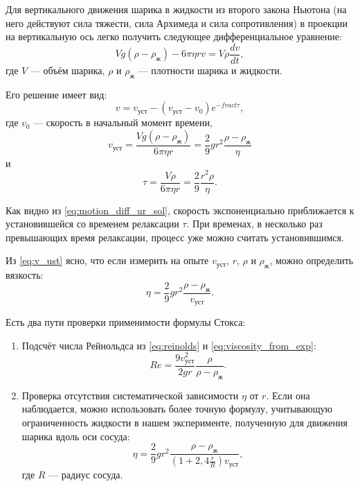 \documentclass[12pt]{article}
\begin{document}
	Для вертикального движения шарика в жидкости из второго закона Ньютона (на него действуют сила тяжести, сила Архимеда и сила сопротивления) в проекции на вертикальную ось легко получить следующее дифференциальное уравнение:
	\begin{equation}
	\label{eq:motion_diff_ur}
	Vg \left( \rho -\rho_\text{ж} \right) -6\pi \eta rv=V\rho \frac{dv}{dt},
	\end{equation}
	где $V$ --- объём шарика, $\rho$ и $\rho_\text{ж}$ --- плотности шарика и жидкости.
	
	Его решение имеет вид:
	\begin{equation}
	\label{eq:motion_diff_ur_sol}
	v=v_\text{уст}-\left( v_\text{уст}-v_0 \right) e^{-frac{t}{\tau}},
	\end{equation}
	где $v_0$ --- скорость в начальный момент времени,
	\begin{equation}
	\label{eq:v_ust}
	v_\text{уст}=\frac{Vg \left( \rho -\rho_\text{ж} \right)}{6\pi \eta r} = \frac{2}{9} gr^2 \frac{\rho -\rho_\text{ж}}{\eta}
	\end{equation}
	и
	\begin{equation}
	\label{eq:tau}
	\tau=\frac{V \rho}{6\pi \eta r} = \frac{2}{9} \frac{r^2\rho}{\eta}.
	\end{equation}
	
	Как видно из \eqref{eq:motion_diff_ur_sol}, скорость экспоненциально приближается к установившейся со временем релаксации $\tau$. При временах, в несколько раз превышающих время релаксации, процесс уже можно считать установившимся.
	
	Из \eqref{eq:v_ust} ясно, что если измерить на опыте $v_\text{уст}$, $r$, $\rho$ и $\rho_\text{ж}$, можно определить вязкость:
	\begin{equation}
	\label{eq:viscosity_from_exp}
	\eta=\frac{2}{9} gr^2 \frac{\rho -\rho_\text{ж}}{v_\text{уст}}.
	\end{equation}
	
	Есть два пути проверки применимости формулы Стокса:
	\begin{enumerate}
	\item Подсчёт числа Рейнольдса из \eqref{eq:reinolds} и \eqref{eq:viscosity_from_exp}:
	\begin{equation}
	\label{eq:reinolds_from_exp}
	Re=\frac{9 v_\text{уст}^2}{2gr} \frac{\rho}{\rho -\rho_\text{ж}}.
	\end{equation}
	\item Проверка отсутствия систематической зависимости $\eta$ от $r$.
	Если она наблюдается, можно использовать более точную формулу, учитывающую ограниченность жидкости в нашем эксперименте, полученную для движения шарика вдоль оси сосуда:
	\begin{equation}
	\label{eq:viscosity_from_exp_better}
	\eta=\frac{2}{9} gr^2 \frac{\rho -\rho_\text{ж}}{\left( 1 + 2{,}4 \frac{r}{R} \right) v_\text{уст}},
	\end{equation}
	где $R$ --- радиус сосуда.
	\end{enumerate}
	
\end{document}
